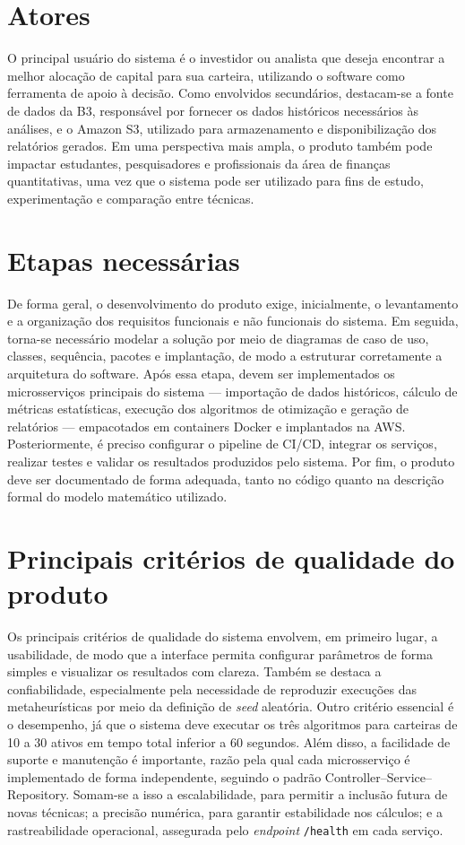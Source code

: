 \documentclass[
	12pt,				%
	openright,			%
	oneside,			    %
	a4paper,				%
	english,			%
	french,			%
	spanish,			%
	brazil			%
	]{abntex2}
\begin{document}
\section{Atores}

O principal usuário do sistema é o investidor ou analista que deseja encontrar a melhor alocação de capital para sua carteira, utilizando o software como ferramenta de apoio à decisão. Como envolvidos secundários, destacam-se a fonte de dados da B3, responsável por fornecer os dados históricos necessários às análises, e o Amazon S3, utilizado para armazenamento e disponibilização dos relatórios gerados. Em uma perspectiva mais ampla, o produto também pode impactar estudantes, pesquisadores e profissionais da área de finanças quantitativas, uma vez que o sistema pode ser utilizado para fins de estudo, experimentação e comparação entre técnicas.

\section{Etapas necessárias}

De forma geral, o desenvolvimento do produto exige, inicialmente, o levantamento e a organização dos requisitos funcionais e não funcionais do sistema. Em seguida, torna-se necessário modelar a solução por meio de diagramas de caso de uso, classes, sequência, pacotes e implantação, de modo a estruturar corretamente a arquitetura do software. Após essa etapa, devem ser implementados os microsserviços principais do sistema — importação de dados históricos, cálculo de métricas estatísticas, execução dos algoritmos de otimização e geração de relatórios — empacotados em containers Docker e implantados na AWS. Posteriormente, é preciso configurar o pipeline de CI/CD, integrar os serviços, realizar testes e validar os resultados produzidos pelo sistema. Por fim, o produto deve ser documentado de forma adequada, tanto no código quanto na descrição formal do modelo matemático utilizado.

\section{Principais critérios de qualidade do produto}

Os principais critérios de qualidade do sistema envolvem, em primeiro lugar, a usabilidade, de modo que a interface permita configurar parâmetros de forma simples e visualizar os resultados com clareza. Também se destaca a confiabilidade, especialmente pela necessidade de reproduzir execuções das metaheurísticas por meio da definição de \textit{seed} aleatória. Outro critério essencial é o desempenho, já que o sistema deve executar os três algoritmos para carteiras de 10 a 30 ativos em tempo total inferior a 60 segundos. Além disso, a facilidade de suporte e manutenção é importante, razão pela qual cada microsserviço é implementado de forma independente, seguindo o padrão Controller--Service--Repository. Somam-se a isso a escalabilidade, para permitir a inclusão futura de novas técnicas; a precisão numérica, para garantir estabilidade nos cálculos; e a rastreabilidade operacional, assegurada pelo \textit{endpoint} \texttt{/health} em cada serviço.
\end{document}
